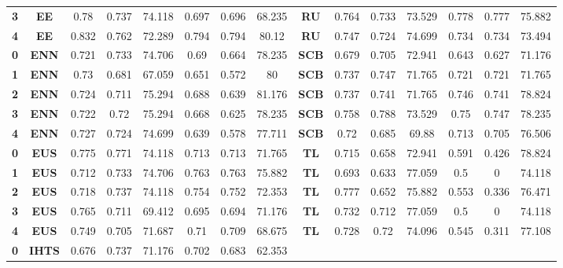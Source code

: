 {{\begin{tabular}{c|c|cccccc|ccccccc}
\textbf{3} & \textbf{EE} & 0.78  & 0.737 & 74.118 & 0.697 & 0.696 & 68.235 & \multicolumn{1}{c|}{\textbf{RU}} & 0.764 & 0.733 & 73.529 & 0.778 & 0.777 & 75.882 \\
\textbf{4} & \textbf{EE} & 0.832 & 0.762 & 72.289 & 0.794 & 0.794 & 80.12 & \multicolumn{1}{c|}{\textbf{RU}} & 0.747 & 0.724 & 74.699 & 0.734 & 0.734 & 73.494 \\
\textbf{0} & \textbf{ENN} & 0.721 & 0.733 & 74.706 & 0.69  & 0.664 & 78.235 & \multicolumn{1}{c|}{\textbf{SCB}} & 0.679 & 0.705 & 72.941 & 0.643 & 0.627 & 71.176 \\
\textbf{1} & \textbf{ENN} & 0.73  & 0.681 & 67.059 & 0.651 & 0.572 & 80    & \multicolumn{1}{c|}{\textbf{SCB}} & 0.737 & 0.747 & 71.765 & 0.721 & 0.721 & 71.765 \\
\textbf{2} & \textbf{ENN} & 0.724 & 0.711 & 75.294 & 0.688 & 0.639 & 81.176 & \multicolumn{1}{c|}{\textbf{SCB}} & 0.737 & 0.741 & 71.765 & 0.746 & 0.741 & 78.824 \\
\textbf{3} & \textbf{ENN} & 0.722 & 0.72  & 75.294 & 0.668 & 0.625 & 78.235 & \multicolumn{1}{c|}{\textbf{SCB}} & 0.758 & 0.788 & 73.529 & 0.75  & 0.747 & 78.235 \\
\textbf{4} & \textbf{ENN} & 0.727 & 0.724 & 74.699 & 0.639 & 0.578 & 77.711 & \multicolumn{1}{c|}{\textbf{SCB}} & 0.72  & 0.685 & 69.88 & 0.713 & 0.705 & 76.506 \\
\textbf{0} & \textbf{EUS} & 0.775 & 0.771 & 74.118 & 0.713 & 0.713 & 71.765 & \multicolumn{1}{c|}{\textbf{TL}} & 0.715 & 0.658 & 72.941 & 0.591 & 0.426 & 78.824 \\
\textbf{1} & \textbf{EUS} & 0.712 & 0.733 & 74.706 & 0.763 & 0.763 & 75.882 & \multicolumn{1}{c|}{\textbf{TL}} & 0.693 & 0.633 & 77.059 & 0.5   & 0     & 74.118 \\
\textbf{2} & \textbf{EUS} & 0.718 & 0.737 & 74.118 & 0.754 & 0.752 & 72.353 & \multicolumn{1}{c|}{\textbf{TL}} & 0.777 & 0.652 & 75.882 & 0.553 & 0.336 & 76.471 \\
\textbf{3} & \textbf{EUS} & 0.765 & 0.711 & 69.412 & 0.695 & 0.694 & 71.176 & \multicolumn{1}{c|}{\textbf{TL}} & 0.732 & 0.712 & 77.059 & 0.5   & 0     & 74.118 \\
\textbf{4} & \textbf{EUS} & 0.749 & 0.705 & 71.687 & 0.71  & 0.709 & 68.675 & \multicolumn{1}{c|}{\textbf{TL}} & 0.728 & 0.72  & 74.096 & 0.545 & 0.311 & 77.108 \\
\textbf{0} & \textbf{IHTS} & 0.676 & 0.737 & 71.176 & 0.702 & 0.683 & 62.353 &       &       &       &       &       &       &  \\

\end{tabular}}}
